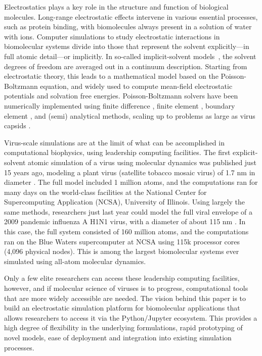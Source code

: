 Electrostatics plays a key role in the structure and function of biological molecules.
Long-range electrostatic effects intervene in various essential processes, such as protein binding, with biomolecules always present in a solution of water with ions.
Computer simulations to study electrostatic interactions in biomolecular systems divide into those that represent the solvent explicitly---in full atomic detail---or implicitly.
In so-called implicit-solvent models~\cite{RouxSimonson1999,DecherchiETal2015}, the solvent degrees of freedom are averaged out in a continuum description.
Starting from electrostatic theory, this leads to a mathematical model based on the Poisson-Boltzmann equation, and widely used to compute mean-field electrostatic potentials and solvation free energies.
Poisson-Boltzmann solvers have been numerically implemented using finite difference \cite{RocchiaAlexovHonig2001, BakerETal2001}, finite element \cite{BakerETal2001,BondETal2010,HolstETal2012}, boundary element \cite{AltmanBardhanWhiteTidor2009, GengKrasny2013, ZhangPengHuangPitsianisSunLu2015, CooperBardhanBarba2014}, and (semi) analytical \cite{LotanHead-Gordon2006,FelbergETal2017} methods, scaling up to problems as large as virus capsids \cite{ZhangETal2019,MartinezETal2019}.

Virus-scale simulations are at the limit of what can be accomplished in computational biophysics, using leadership computing facilities.
The first explicit-solvent atomic simulation of a virus using molecular dynamics was published just 15 years ago, modeling a plant virus (satellite tobacco mosaic virus) of 1.7 nm in diameter \cite{FreddolinoETal2006}.
The full model included 1 million atoms, and the computations ran for many days on the world-class facilities at the National Center for Supercomputing Application (NCSA), University of Illinois.
Using largely the same methods, researchers just last year could model the full viral envelope of a 2009 pandemic influenza A H1N1 virus, with a diameter of about 115 nm \cite{DurrantETal2020}.
In this case, the full system consisted of 160 million atoms, and the computations ran on the Blue Waters supercomputer at NCSA using 115k processor cores (4,096 physical nodes).
This is among the largest biomolecular systems ever simulated using all-atom molecular dynamics.

Only a few elite researchers can access these leadership computing facilities, however, and if molecular science of viruses is to progress, computational tools that are more widely accessible are needed.
The vision behind this paper is to build an electrostatic simulation platform for biomolecular applications that allows researchers to access it via the Python/Jupyter ecosystem. This provides a high degree of flexibility in the underlying formulations, rapid prototyping of novel models, ease of deployment and integration into existing simulation processes.

